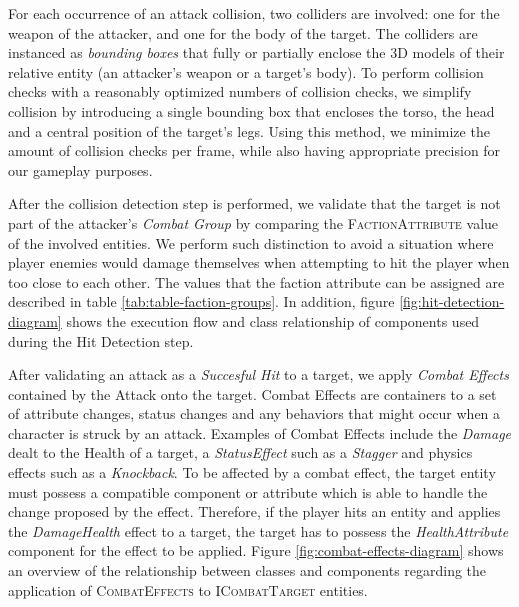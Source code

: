 For each occurrence of an attack collision, two colliders are involved: one for the weapon of the attacker, and one for the body of the target. The colliders are instanced as \emph{bounding boxes} that fully or partially enclose the 3D models of their relative entity (an attacker's weapon or a target's body). To perform collision checks with a reasonably optimized numbers of collision checks, we simplify collision by introducing a single bounding box that encloses the torso, the head and a central position of the target's legs. Using this method, we minimize the amount of collision checks per frame, while also having appropriate precision for our gameplay purposes.

After the collision detection step is performed, we validate that the target is not part of the attacker's \emph{Combat Group} by comparing the \textsc{FactionAttribute} value of the involved entities. We perform such distinction to avoid a situation where player enemies would damage themselves when attempting to hit the player when too close to each other. The values that the faction attribute can be assigned are described in table \ref{tab:table-faction-groups}. In addition, figure \ref{fig:hit-detection-diagram} shows the execution flow and class relationship of components used during the Hit Detection step.





After validating an attack as a \emph{Succesful Hit} to a target, we apply \emph{Combat Effects} contained by the Attack onto the target. Combat Effects are containers to a set of attribute changes, status changes and any behaviors that might occur when a character is struck by an attack. Examples of Combat Effects include the \emph{Damage} dealt to the Health of a target, a \emph{StatusEffect} such as a \emph{Stagger} and physics effects such as a \emph{Knockback}. To be affected by a combat effect, the target entity must possess a compatible component or attribute which is able to handle the change proposed by the effect. Therefore, if the player hits an entity and applies the \emph{DamageHealth} effect to a target, the target has to possess the \emph{HealthAttribute} component for the effect to be applied. Figure \ref{fig:combat-effects-diagram} shows an overview of the relationship between classes and components regarding the application of \textsc{CombatEffects} to \textsc{ICombatTarget} entities.

